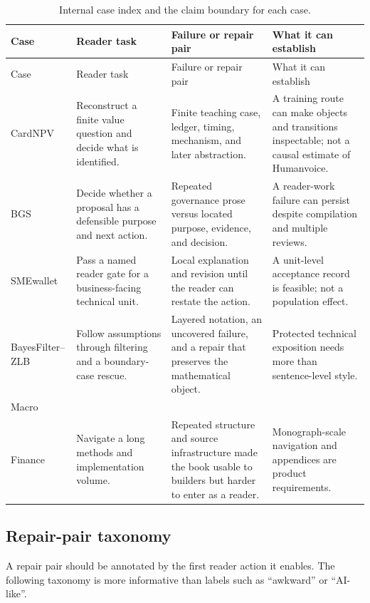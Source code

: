 \begin{longtable}{@{}>{\raggedright\arraybackslash}p{}
>{\raggedright\arraybackslash}p{}
>{\raggedright\arraybackslash}p{}
>{\raggedright\arraybackslash}p{}@{}}
\caption{Internal case index and the claim boundary for each case.}
\label{tab:case-index}\\
\toprule
Case & Reader task & Failure or repair pair & What it can establish \\
\midrule
\endfirsthead
\toprule
Case & Reader task & Failure or repair pair & What it can establish \\
\midrule
\endhead
CardNPV & Reconstruct a finite value question and decide what is identified. &
Finite teaching case, ledger, timing, mechanism, and later abstraction. & A
training route can make objects and transitions inspectable; not a causal
estimate of Humanvoice. \\
BGS & Decide whether a proposal has a defensible purpose and next action. &
Repeated governance prose versus located purpose, evidence, and decision. & A
reader-work failure can persist despite compilation and multiple reviews. \\
SMEwallet & Pass a named reader gate for a business-facing technical unit. &
Local explanation and revision until the reader can restate the action. & A
unit-level acceptance record is feasible; not a population effect. \\
BayesFilter--ZLB & Follow assumptions through filtering and a boundary-case
rescue. & Layered notation, an uncovered failure, and a repair that preserves
the mathematical object. & Protected technical exposition needs more than
sentence-level style. \\
Macro\\Finance & Navigate a long methods and implementation volume. & Repeated
structure and source infrastructure made the book usable to builders but
harder to enter as a reader. & Monograph-scale navigation and appendices are
product requirements. \\
\bottomrule
\end{longtable}

\subsection{Repair-pair taxonomy}

A repair pair should be annotated by the first reader action it enables. The
following taxonomy is more informative than labels such as ``awkward'' or
``AI-like''.

